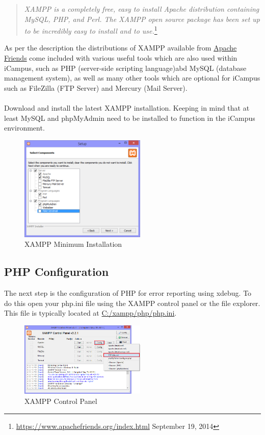 \documentclass[]{report}
\begin{document}
\begin{quote}
	\textit{XAMPP is a completely free, easy to install Apache distribution containing MySQL, PHP, and Perl. The XAMPP open source package has been set up to be incredibly easy to install and to use.}\footnote{\url{https://www.apachefriends.org/index.html} September 19, 2014}
\end{quote}

\noindent
As per the description the distributions of XAMPP available from \href{https://www.apachefriends.org/index.html}{Apache Friends} come included with various useful tools which are also used within iCampus, such as PHP (server-side scripting language)abd MySQL (database management system), as well as many other tools which are optional for iCampus such as FileZilla (FTP Server) and Mercury (Mail Server).\\
\\
Download and install the latest XAMPP installation. Keeping in mind that at least MySQL and phpMyAdmin need to be installed to function in the iCampus environment.

\begin{figure}[h] 
	\centering
	\includegraphics[width=6cm]{xampp.png}
	\caption{XAMPP Minimum Installation}
\end{figure}

\newpage
\subsection{PHP Configuration}
\label{subsec:phpconfig}

The next step is the configuration of PHP for error reporting using xdebug. To do this open your php.ini file using the XAMPP control panel or the file explorer. This file is typically located at \url{C:/xampp/php/php.ini}.\\

\begin{figure}[h] 
	\centering
	\includegraphics[width=6cm]{openphpini.png}
	\caption{XAMPP Control Panel}
	\label{fig:xamppcontrolpanel}
\end{figure}
\end{document}

